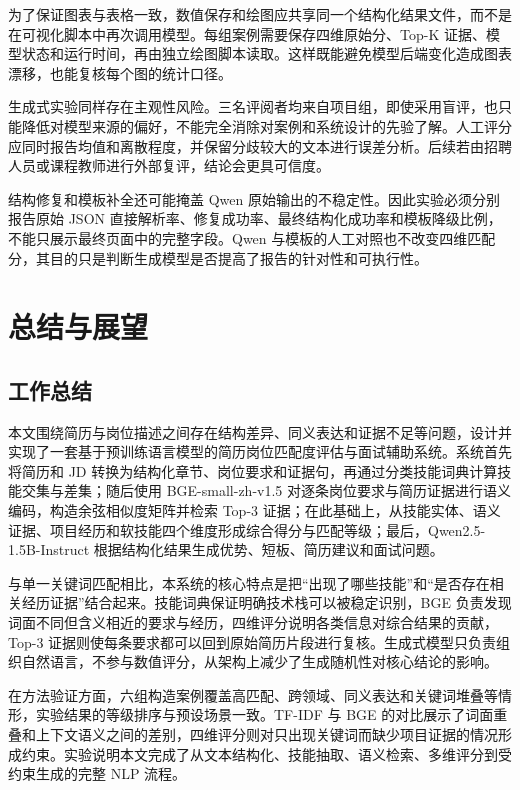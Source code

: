 \documentclass[UTF8,zihao=-4,a4paper,oneside]{ctexrep}
\begin{document}
为了保证图表与表格一致，数值保存和绘图应共享同一个结构化结果文件，而不是在可视化脚本中再次调用模型。每组案例需要保存四维原始分、Top-K 证据、模型状态和运行时间，再由独立绘图脚本读取。这样既能避免模型后端变化造成图表漂移，也能复核每个图的统计口径。


生成式实验同样存在主观性风险。三名评阅者均来自项目组，即使采用盲评，也只能降低对模型来源的偏好，不能完全消除对案例和系统设计的先验了解。人工评分应同时报告均值和离散程度，并保留分歧较大的文本进行误差分析。后续若由招聘人员或课程教师进行外部复评，结论会更具可信度。


结构修复和模板补全还可能掩盖 Qwen 原始输出的不稳定性。因此实验必须分别报告原始 JSON 直接解析率、修复成功率、最终结构化成功率和模板降级比例，不能只展示最终页面中的完整字段。Qwen 与模板的人工对照也不改变四维匹配分，其目的只是判断生成模型是否提高了报告的针对性和可执行性。


\chapter{总结与展望}


\section{工作总结}


本文围绕简历与岗位描述之间存在结构差异、同义表达和证据不足等问题，设计并实现了一套基于预训练语言模型的简历岗位匹配度评估与面试辅助系统。系统首先将简历和 JD 转换为结构化章节、岗位要求和证据句，再通过分类技能词典计算技能交集与差集；随后使用 BGE-small-zh-v1.5 对逐条岗位要求与简历证据进行语义编码，构造余弦相似度矩阵并检索 Top-3 证据；在此基础上，从技能实体、语义证据、项目经历和软技能四个维度形成综合得分与匹配等级；最后，Qwen2.5-1.5B-Instruct 根据结构化结果生成优势、短板、简历建议和面试问题。


与单一关键词匹配相比，本系统的核心特点是把“出现了哪些技能”和“是否存在相关经历证据”结合起来。技能词典保证明确技术栈可以被稳定识别，BGE 负责发现词面不同但含义相近的要求与经历，四维评分说明各类信息对综合结果的贡献，Top-3 证据则使每条要求都可以回到原始简历片段进行复核。生成式模型只负责组织自然语言，不参与数值评分，从架构上减少了生成随机性对核心结论的影响。


在方法验证方面，六组构造案例覆盖高匹配、跨领域、同义表达和关键词堆叠等情形，实验结果的等级排序与预设场景一致。TF-IDF 与 BGE 的对比展示了词面重叠和上下文语义之间的差别，四维评分则对只出现关键词而缺少项目证据的情况形成约束。实验说明本文完成了从文本结构化、技能抽取、语义检索、多维评分到受约束生成的完整 NLP 流程。
\end{document}
